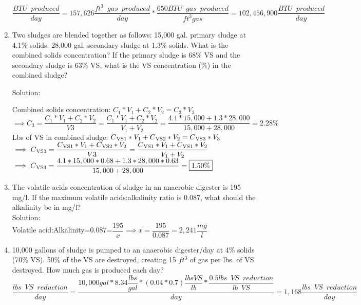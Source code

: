 \documentclass{article}
\begin{document}
\begin{enumerate}
$
	\dfrac 
	{
	BTU \enspace produced
	}
	{
	day
	}
	=
	157,626 \dfrac
			{
			ft^3 \enspace gas \enspace produced
			}
			{
			day
			}
			*
		\dfrac
		{
		650 BTU \enspace gas \enspace produced
		}
		{
		ft^3 gas
		}
		=\boxed{102,456,900 \dfrac
				{
				BTU \enspace produced
				}
				{
				day
				}}
$

\item Two sludges are blended together as follows: 15,000 gal. primary sludge at 4.1\% solids. 28,000 gal. secondary sludge at 1.3\% solids. What is the combined solids concentration?  If the primary sludge is 68\% VS and the secondary sludge is 63\% VS, what is the VS concentration (\%) in the combined sludge?

Solution:

Combined solids concentration:
$
C_1*V_1 + C_2*V_2 = C_3*V_3$\\
$\implies C_3 = \dfrac{C_1*V_1 + C_2*V_2}{V3}=\dfrac{C_1*V_1 + C_2*V_2}{V_1 + V_2}=\dfrac{4.1*15,000 + 1.3*28,000}{15,000 + 28,000}=\boxed{2.28\%}
$\\
Lbs of VS in combined sludge:
$
C\textsubscript{VS1}*V_1 + C\textsubscript{VS2}*V_2 = C\textsubscript{VS3}*V_3$\\
$\implies C\textsubscript{VS3} = \dfrac{C\textsubscript{VS1}*V_1 + C\textsubscript{VS2}*V_2}{V3}=\dfrac{C\textsubscript{VS1}*V_1 + C\textsubscript{VS1}*V_2}{V_1 + V_2}$\\
$\implies C\textsubscript{VS3}
=\dfrac{4.1*15,000*0.68 + 1.3*28,000*0.63}{15,000 + 28,000}=\boxed{1.50\%}$
\\


\item The volatile acids concentration of sludge in an anaerobic digester is 195 mg/l. If the maximum volatile acids:alkalinity ratio is 0.087, what should the alkalinity be in mg/l?\\
Solution:\\
Volatile acid:Alkalinity=0.087=$\dfrac{195}{x}\implies x = \dfrac{195}{0.087} =\boxed{2,241\dfrac{mg}{l}}$
\pagebreak
	
\item 10,000 gallons of sludge is pumped to an anaerobic digester/day at 4\% solids (70\% VS).  50\% of the VS are destroyed, creating 15 $ft^3$ of gas per lbs. of VS destroyed. How much gas is produced each day?\\

{
$
	\dfrac
	{
	lbs \enspace VS \enspace reduction
	}
	{
	day
	}
	=
	\dfrac
	{
	10,000 gal * 8.34 \dfrac{lbs}{gal}*(0.04*0.7) \dfrac{lbs VS}{lb}*\dfrac{0.5 lbs \enspace VS \enspace  reduction}{lb \enspace VS}
	}
	{
	day
	}
 	=1,168
	\dfrac
	{
	lbs \enspace VS \enspace reduction
	}
	{
	day 
	}
$
}\\
\vspace{3mm}


\end{enumerate}
\end{document}
